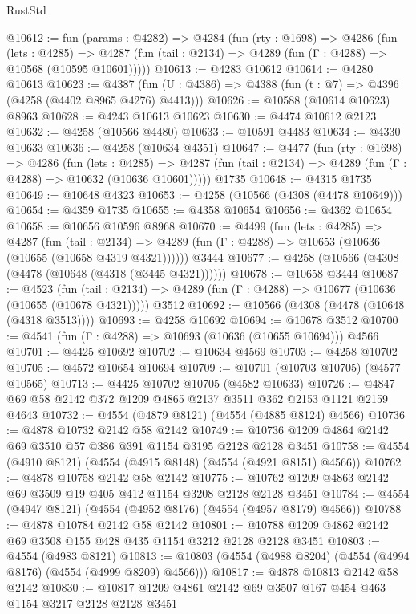 \begin{lexlean}{RustStd}
\begin{coremodule}
@10612 := fun (params : @4282) =>
  @4284
    (fun (rty : @1698) =>
    @4286
      (fun (lets : @4285) =>
      @4287 (fun (tail : @2134) => @4289 (fun (Γ : @4288) => @10568 (@10595 @10601)))))
@10613 := @4283 @10612
@10614 := @4280 @10613
@10623 := @4387 (fun (U : @4386) => @4388 (fun (t : @7) => @4396 (@4258 (@4402 @8965 @4276) @4413)))
@10626 := @10588 (@10614 @10623) @8963
@10628 := @4243 @10613 @10623
@10630 := @4474 @10612 @2123
@10632 := @4258 (@10566 @4480)
@10633 := @10591 @4483
@10634 := @4330 @10633
@10636 := @4258 (@10634 @4351)
@10647 := @4477
    (fun (rty : @1698) =>
    @4286
      (fun (lets : @4285) =>
      @4287 (fun (tail : @2134) => @4289 (fun (Γ : @4288) => @10632 (@10636 @10601)))))
    @1735
@10648 := @4315 @1735
@10649 := @10648 @4323
@10653 := @4258 (@10566 (@4308 (@4478 @10649)))
@10654 := @4359 @1735
@10655 := @4358 @10654
@10656 := @4362 @10654
@10658 := @10656 @10596 @8968
@10670 := @4499
    (fun (lets : @4285) =>
    @4287
      (fun (tail : @2134) =>
      @4289 (fun (Γ : @4288) => @10653 (@10636 (@10655 (@10658 @4319 @4321))))))
    @3444
@10677 := @4258 (@10566 (@4308 (@4478 (@10648 (@4318 (@3445 @4321))))))
@10678 := @10658 @3444
@10687 := @4523
    (fun (tail : @2134) => @4289 (fun (Γ : @4288) => @10677 (@10636 (@10655 (@10678 @4321)))))
    @3512
@10692 := @10566 (@4308 (@4478 (@10648 (@4318 @3513))))
@10693 := @4258 @10692
@10694 := @10678 @3512
@10700 := @4541 (fun (Γ : @4288) => @10693 (@10636 (@10655 @10694))) @4566
@10701 := @4425 @10692
@10702 := @10634 @4569
@10703 := @4258 @10702
@10705 := @4572 @10654 @10694
@10709 := @10701 (@10703 @10705) (@4577 @10565)
@10713 := @4425 @10702 @10705 (@4582 @10633)
@10726 := @4847 @69 @58 @2142 @372 @1209 @4865 @2137 @3511 @362 @2153 @1121 @2159 @4643
@10732 := @4554 (@4879 @8121) (@4554 (@4885 @8124) @4566)
@10736 := @4878 @10732 @2142 @58 @2142
@10749 := @10736 @1209 @4864 @2142 @69 @3510 @57 @386 @391 @1154 @3195 @2128 @2128 @3451
@10758 := @4554 (@4910 @8121) (@4554 (@4915 @8148) (@4554 (@4921 @8151) @4566))
@10762 := @4878 @10758 @2142 @58 @2142
@10775 := @10762 @1209 @4863 @2142 @69 @3509 @19 @405 @412 @1154 @3208 @2128 @2128 @3451
@10784 := @4554 (@4947 @8121) (@4554 (@4952 @8176) (@4554 (@4957 @8179) @4566))
@10788 := @4878 @10784 @2142 @58 @2142
@10801 := @10788 @1209 @4862 @2142 @69 @3508 @155 @428 @435 @1154 @3212 @2128 @2128 @3451
@10803 := @4554 (@4983 @8121)
@10813 := @10803 (@4554 (@4988 @8204) (@4554 (@4994 @8176) (@4554 (@4999 @8209) @4566)))
@10817 := @4878 @10813 @2142 @58 @2142
@10830 := @10817 @1209 @4861 @2142 @69 @3507 @167 @454 @463 @1154 @3217 @2128 @2128 @3451

\end{coremodule}
\end{lexlean}

